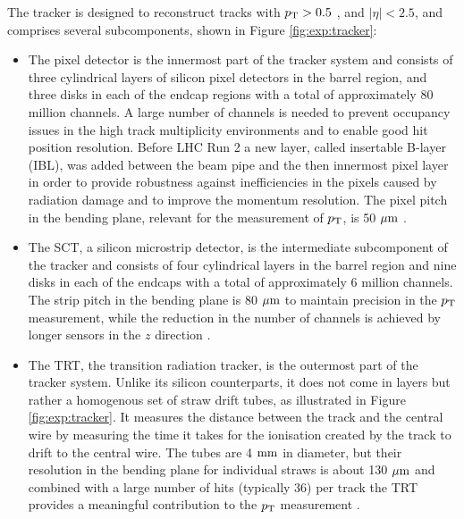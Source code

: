 The tracker is designed to reconstruct tracks with $p_{\text{T}} > 0.5$ \GeV, and
$|\eta| < 2.5$, and comprises several subcomponents, shown in Figure
\ref{fig:exp:tracker}:
\begin{itemize}
\item The pixel detector is the innermost part of the tracker system and
consists of three cylindrical layers of silicon pixel detectors in the
barrel region, and three disks in each of the endcap regions with a total of
approximately 80 million channels. A large number of channels is needed
to prevent occupancy issues in the high track multiplicity environments
and to enable good hit position resolution. Before LHC Run 2 a new layer,
called insertable B-layer (IBL), was added between the beam pipe and the
then innermost pixel layer in order to provide robustness against
inefficiencies in the pixels caused by radiation damage and to improve
the momentum resolution. The pixel pitch in the bending plane, relevant for the
measurement of $p_{\text{T}}$, is 50 $\mu\text{m}$ \cite{CERN-LHCC-97-016, Aad:2008zzm, Capeans:1291633}. 
\item The SCT, a silicon microstrip detector, is the intermediate subcomponent
of the tracker and consists of four cylindrical layers in the barrel region
and nine disks in each of the endcaps with a total of approximately 6 million
channels. The strip pitch in the bending plane is 80 $\mu\text{m}$ to maintain
precision in the $p_{\text{T}}$ measurement, while the reduction in the number of
channels is achieved by longer sensors in the $z$ direction \cite{CERN-LHCC-97-016, Aad:2008zzm}.
\item The TRT, the transition radiation tracker, is the outermost part of the
tracker system. Unlike its silicon counterparts, it does not come in layers
but rather a homogenous set of straw drift tubes, as illustrated in
Figure \ref{fig:exp:tracker}. It measures the distance between the track
and the central wire by measuring the time it takes for the ionisation
created by the track to drift to the central wire. The tubes are 4 $\text{mm}$
in diameter, but their resolution in the bending plane for individual
straws is about 130 $\mu\text{m}$ and combined with a large number of hits (typically 36)
per track the TRT provides a meaningful contribution to the
$p_{\text{T}}$ measurement \cite{CERN-LHCC-97-016, Aad:2008zzm}.
\end{itemize}

